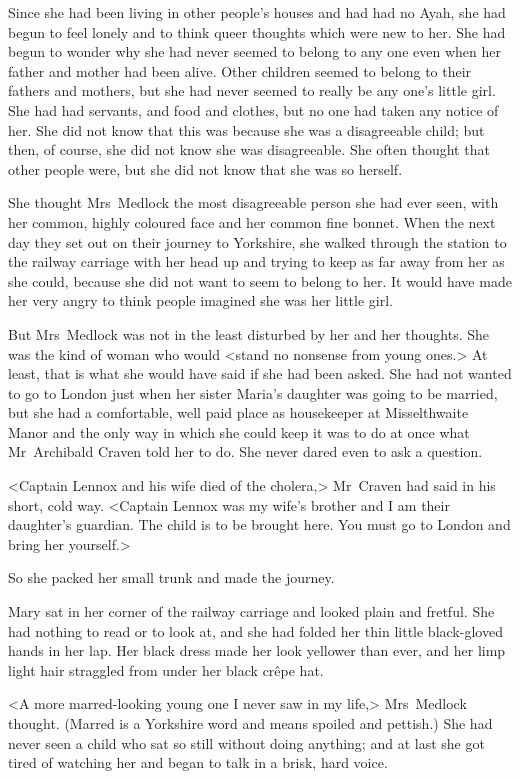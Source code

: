 Since she had been living in other people's houses and had had no Ayah, she had begun to feel lonely and to think queer thoughts which were new to her. She had begun to wonder why she had never seemed to belong to any one even when her father and mother had been alive. Other children seemed to belong to their fathers and mothers, but she had never seemed to really be any one's little girl. She had had servants, and food and clothes, but no one had taken any notice of her. She did not know that this was because she was a disagreeable child; but then, of course, she did not know she was disagreeable. She often thought that other people were, but she did not know that she was so herself.

She thought Mrs~Medlock the most disagreeable person she had ever seen, with her common, highly coloured face and her common fine bonnet. When the next day they set out on their journey to Yorkshire, she walked through the station to the railway carriage with her head up and trying to keep as far away from her as she could, because she did not want to seem to belong to her. It would have made her very angry to think people imagined she was her little girl.

But Mrs~Medlock was not in the least disturbed by her and her thoughts. She was the kind of woman who would <stand no nonsense from young ones.> At least, that is what she would have said if she had been asked. She had not wanted to go to London just when her sister Maria's daughter was going to be married, but she had a comfortable, well paid place as housekeeper at Misselthwaite Manor and the only way in which she could keep it was to do at once what Mr~Archibald Craven told her to do. She never dared even to ask a question.

<Captain Lennox and his wife died of the cholera,> Mr~Craven had said in his short, cold way. <Captain Lennox was my wife's brother and I am their daughter's guardian. The child is to be brought here. You must go to London and bring her yourself.>

So she packed her small trunk and made the journey.

Mary sat in her corner of the railway carriage and looked plain and fretful. She had nothing to read or to look at, and she had folded her thin little black-gloved hands in her lap. Her black dress made her look yellower than ever, and her limp light hair straggled from under her black crêpe hat.

<A more marred-looking young one I never saw in my life,> Mrs~Medlock thought. (Marred is a Yorkshire word and means spoiled and pettish.) She had never seen a child who sat so still without doing anything; and at last she got tired of watching her and began to talk in a brisk, hard voice.

